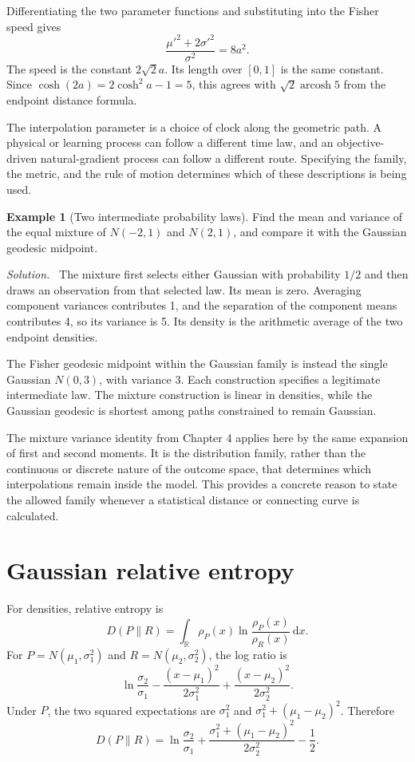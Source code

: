 \documentclass[11pt,oneside,openany]{book}
\theoremstyle{definition}
\newtheorem{example}{Example}[chapter]
\theoremstyle{remark}
\newenvironment{solution}{\par\smallskip\noindent\textit{Solution.}\ }{\par\smallskip}
\newcommand{\R}{\mathbb{R}}
\newcommand{\arcosh}{\operatorname{arcosh}}
\newcommand{\dd}{\,\mathrm{d}}
\numberwithin{equation}{chapter}
\begin{document}
Differentiating the two parameter functions and substituting into the Fisher speed gives
\[
\frac{\mu'^2+2\sigma'^2}{\sigma^2}=8a^2.
\]
The speed is the constant $2\sqrt2a$. Its length over $[0,1]$ is the same constant. Since $\cosh(2a)=2\cosh^2a-1=5$, this agrees with $\sqrt2\arcosh5$ from the endpoint distance formula.

The interpolation parameter is a choice of clock along the geometric path. A physical or learning process can follow a different time law, and an objective-driven natural-gradient process can follow a different route. Specifying the family, the metric, and the rule of motion determines which of these descriptions is being used.

\begin{example}[Two intermediate probability laws]
Find the mean and variance of the equal mixture of $N(-2,1)$ and $N(2,1)$, and compare it with the Gaussian geodesic midpoint.
\begin{solution}
The mixture first selects either Gaussian with probability $1/2$ and then draws an observation from that selected law. Its mean is zero. Averaging component variances contributes 1, and the separation of the component means contributes 4, so its variance is 5. Its density is the arithmetic average of the two endpoint densities.

The Fisher geodesic midpoint within the Gaussian family is instead the single Gaussian $N(0,3)$, with variance 3. Each construction specifies a legitimate intermediate law. The mixture construction is linear in densities, while the Gaussian geodesic is shortest among paths constrained to remain Gaussian.
\end{solution}
\end{example}

The mixture variance identity from Chapter 4 applies here by the same expansion of first and second moments. It is the distribution family, rather than the continuous or discrete nature of the outcome space, that determines which interpolations remain inside the model. This provides a concrete reason to state the allowed family whenever a statistical distance or connecting curve is calculated.

\section{Gaussian relative entropy}
For densities, relative entropy is
\[
D(P\|R)=\int_{\R}\rho_P(x)\ln\frac{\rho_P(x)}{\rho_R(x)}\dd x.
\]
For $P=N(\mu_1,\sigma_1^2)$ and $R=N(\mu_2,\sigma_2^2)$, the log ratio is
\[
\ln\frac{\sigma_2}{\sigma_1}
-\frac{(x-\mu_1)^2}{2\sigma_1^2}
+\frac{(x-\mu_2)^2}{2\sigma_2^2}.
\]
Under $P$, the two squared expectations are $\sigma_1^2$ and $\sigma_1^2+(\mu_1-\mu_2)^2$. Therefore
\begin{equation}\label{eq:gaussiankl}
\boxed{D(P\|R)=\ln\frac{\sigma_2}{\sigma_1}
+\frac{\sigma_1^2+(\mu_1-\mu_2)^2}{2\sigma_2^2}-\frac12.}
\end{equation}
\end{document}
